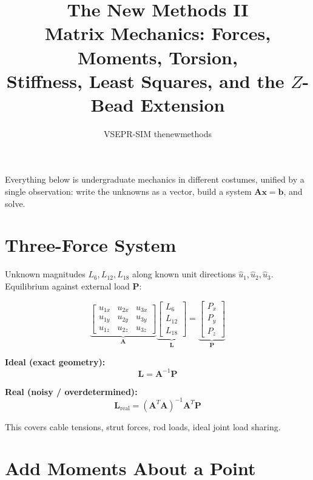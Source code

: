 \documentclass[11pt, letterpaper]{article}
\title{\textbf{The New Methods II}\\[0.4em]
\large Matrix Mechanics: Forces, Moments, Torsion,\\
Stiffness, Least Squares, and the $Z$-Bead Extension}
\author{VSEPR-SIM thenewmethods}
\date{}
\newcommand{\bL}{\mathbf{L}}
\newcommand{\bA}{\mathbf{A}}
\newcommand{\bP}{\mathbf{P}}
\newcommand{\bx}{\mathbf{x}}
\begin{document}
\maketitle
\thispagestyle{empty}

\noindent
Everything below is undergraduate mechanics in different costumes, unified
by a single observation: write the unknowns as a vector, build a system
$\bA\bx = \mathbf{b}$, and solve.

\section{Three-Force System}

Unknown magnitudes $L_6, L_{12}, L_{18}$ along known unit directions
$\hat{u}_1, \hat{u}_2, \hat{u}_3$.
Equilibrium against external load $\mathbf{P}$:

\[
\underbrace{\begin{bmatrix}
u_{1x} & u_{2x} & u_{3x}\\
u_{1y} & u_{2y} & u_{3y}\\
u_{1z} & u_{2z} & u_{3z}
\end{bmatrix}}_{\bA}
\underbrace{\begin{bmatrix} L_6 \\ L_{12} \\ L_{18} \end{bmatrix}}_{\bL}
=
\underbrace{\begin{bmatrix} P_x \\ P_y \\ P_z \end{bmatrix}}_{\bP}
\]

\medskip\noindent
\textbf{Ideal (exact geometry):}
\[
\bL = \bA^{-1}\bP
\]

\noindent
\textbf{Real (noisy / overdetermined):}
\[
\bL_{\mathrm{real}} = (\bA^T\bA)^{-1}\bA^T\bP
\]

\noindent
This covers cable tensions, strut forces, rod loads, ideal joint load sharing.

\section{Add Moments About a Point}
\end{document}
